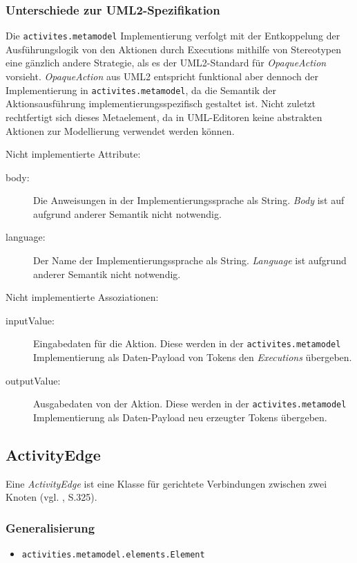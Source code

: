 \subsubsection{Unterschiede zur UML2-Spezifikation}
Die \texttt{activites.metamodel} Implementierung verfolgt mit der Entkoppelung der Ausführungslogik von den Aktionen durch Executions mithilfe von Stereotypen eine gänzlich andere Strategie, als es der UML2-Standard für \emph{OpaqueAction} vorsieht. \emph{OpaqueAction} aus UML2 entspricht funktional aber dennoch der Implementierung in \texttt{activites.metamodel}, da die Semantik der Aktionsausführung implementierungsspezifisch gestaltet ist. Nicht zuletzt rechtfertigt sich dieses Metaelement, da in UML-Editoren keine abstrakten Aktionen zur Modellierung verwendet werden können.

Nicht implementierte Attribute:
\begin{description}
\item[body:] Die Anweisungen in der Implementierungssprache als String. \emph{Body} ist auf aufgrund anderer Semantik nicht notwendig.
\item[language:] Der Name der Implementierungssprache als String. \emph{Language} ist aufgrund anderer Semantik nicht notwendig.
\end{description}

Nicht implementierte Assoziationen:
\begin{description}
\item[inputValue:] Eingabedaten für die Aktion. Diese werden in der \texttt{activites.metamodel} Implementierung als Daten-Payload von Tokens den \emph{Executions} übergeben.
\item[outputValue:] Ausgabedaten von der Aktion. Diese werden in der \texttt{activites.metamodel} Implementierung als Daten-Payload neu erzeugter Tokens übergeben.
\end{description}


\subsection{ActivityEdge}
Eine \emph{ActivityEdge} ist eine Klasse für gerichtete Verbindungen zwischen zwei Knoten (vgl. \citep{OMG2009}, S.325).

\subsubsection{Generalisierung}
\begin{itemize}
\item \texttt{activities.metamodel.elements.Element}
\end{itemize}

